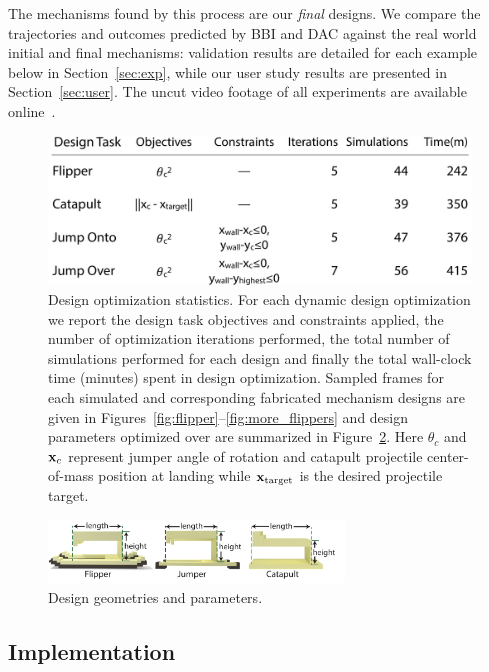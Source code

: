 The mechanisms found by this process are our \emph{final} designs. We compare the trajectories and outcomes predicted by BBI and DAC against the real world initial and final mechanisms: validation results are detailed for each example below in Section~\ref{sec:exp}, while our user study results are presented in Section~\ref{sec:user}. The uncut video footage of all experiments are available online~\cite{Video}.

\begin{figure}[h]
	\centering
\includegraphics[width=0.7\columnwidth]{figs/optTable.pdf}
\caption{Design optimization statistics. For each dynamic design optimization we report the design task objectives and constraints applied, the number of optimization iterations performed, the total number of simulations performed for each design and finally the total wall-clock time (minutes) spent in design optimization. Sampled frames for each simulated and corresponding fabricated mechanism designs are given in Figures~\ref{fig:flipper}--\ref{fig:more_flippers} and design parameters optimized over are summarized in Figure~\ref{fig:params}. Here $\theta_c$ and $\mathbf {x}_c$ represent jumper angle of rotation and catapult projectile center-of-mass position at landing while $\mathbf {x}_{\text{target}}$ is the desired projectile target.
}
\label{table:perf}	
\end{figure}

\begin{figure}[h!]
\centering
\includegraphics[width=0.7\textwidth]{figs/param.pdf}
\caption{Design geometries and parameters.}
\label{fig:params}
\end{figure}	

\subsection{Implementation}

